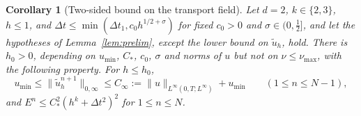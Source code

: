 \documentclass[11pt]{article}
\theoremstyle{remark}\newtheorem{remark}{Remark}
\newcommand{\tu}{\tilde u_h}
\newcommand{\Ph}{P_h}
\theoremstyle{plain}
\newtheorem{corollary}{Corollary}
\newcommand{\new}[1]{{\color{blue}#1}}
\begin{document}
\begin{corollary}[Two-sided bound on the transport field]\label{cor:bootstrap}
\new{Let $d=2$, $k\in\{2,3\}$, $h\le1$, and $\Delta t\le\min(\Delta t_1,c_0h^{1/2+\sigma})$ for fixed $c_0>0$ and $\sigma\in(0,\frac12]$,} and let the hypotheses of Lemma~\ref{lem:prelim}, except the lower bound on $\tu$, hold. There is $h_0>0$, depending on $u_{\min}$, $C_*$, $c_0$\new{, $\sigma$} and norms of $u$ but not on $\nu\le\nu_{\max}$, with the following property. For $h\le h_0$,
\[
u_{\min}\le\|\tu^{n+1}\|_{0,\infty}\le C_\infty:=\|u\|_{L^\infty(0,T;L^\infty)}+u_{\min}\qquad(1\le n\le N-1),
\]
\new{and $E^n\le C_*^2(h^k+\Delta t^2)^2$ for $1\le n\le N$.}
\end{corollary}
\end{document}
